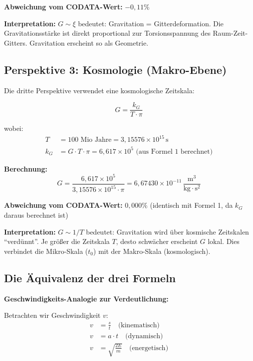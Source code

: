 	\textbf{Abweichung vom CODATA-Wert:} \(-0{,}11\%\)
	
	\textbf{Interpretation:} \(G \sim \xi\) bedeutet: Gravitation = Gitterdeformation. Die Gravitationsstärke ist direkt proportional zur Torsionsspannung des Raum-Zeit-Gitters. Gravitation erscheint so als Geometrie.
	
	\subsection{Perspektive 3: Kosmologie (Makro-Ebene)}
	
	Die dritte Perspektive verwendet eine kosmologische Zeitskala:
	
	\begin{equation}
		\boxed{G = \frac{k_G}{T \cdot \pi}}
	\end{equation}
	
	wobei:
	\begin{align}
		T &= 100 \text{ Mio Jahre} = 3{,}15576 \times 10^{15}\,\text{s} \\
		k_G &= G \cdot T \cdot \pi = 6{,}617 \times 10^5 \text{ (aus Formel 1 berechnet)}
	\end{align}
	
	\textbf{Berechnung:}
	\begin{equation}
		G = \frac{6{,}617 \times 10^5}{3{,}15576 \times 10^{15} \cdot \pi} = 6{,}67430 \times 10^{-11}\,\frac{\text{m}^3}{\text{kg} \cdot \text{s}^2}
	\end{equation}
	
	\textbf{Abweichung vom CODATA-Wert:} \(0{,}000\%\) (identisch mit Formel 1, da \(k_G\) daraus berechnet ist)
	
	\textbf{Interpretation:} \(G \sim 1/T\) bedeutet: Gravitation wird über kosmische Zeitskalen \enquote{verdünnt}. Je größer die Zeitskala \(T\), desto schwächer erscheint \(G\) lokal. Dies verbindet die Mikro-Skala (\(t_0\)) mit der Makro-Skala (kosmologisch).
	
	\subsection{Die Äquivalenz der drei Formeln}
	
	\textbf{Geschwindigkeits-Analogie zur Verdeutlichung:}
	
	Betrachten wir Geschwindigkeit \(v\):
	\begin{align}
		v &= \frac{s}{t} \quad \text{(kinematisch)} \\
		v &= a \cdot t \quad \text{(dynamisch)} \\
		v &= \sqrt{\frac{2E}{m}} \quad \text{(energetisch)}
	\end{align}
	

